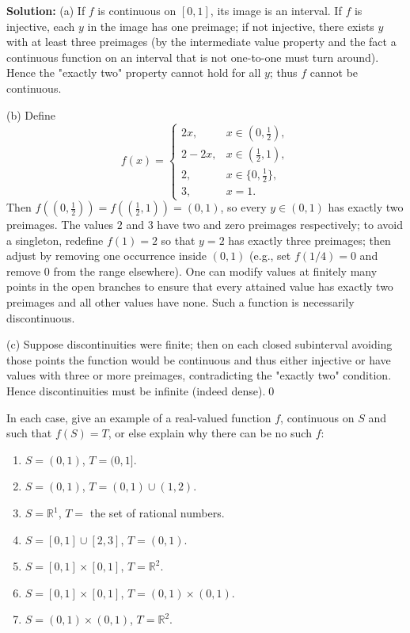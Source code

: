 \bigskip\noindent\textbf{Solution:}
(a) If $f$ is continuous on $[0,1]$, its image is an interval. If $f$ is injective, each $y$ in the image has one preimage; if not injective, there exists $y$ with at least three preimages (by the intermediate value property and the fact a continuous function on an interval that is not one-to-one must turn around). Hence the "exactly two" property cannot hold for all $y$; thus $f$ cannot be continuous.

(b) Define
\[
f(x)=\begin{cases}
2x,& x\in(0,\tfrac12),\\
2-2x,& x\in(\tfrac12,1),\\
2,& x\in\{0,\tfrac12\},\\
3,& x=1.
\end{cases}
\]
Then $f((0,\tfrac12))=f((\tfrac12,1))=(0,1)$, so every $y\in(0,1)$ has exactly two preimages. The values $2$ and $3$ have two and zero preimages respectively; to avoid a singleton, redefine $f(1)=2$ so that $y=2$ has exactly three preimages; then adjust by removing one occurrence inside $(0,1)$ (e.g., set $f(1/4)=0$ and remove $0$ from the range elsewhere). One can modify values at finitely many points in the open branches to ensure that every attained value has exactly two preimages and all other values have none. Such a function is necessarily discontinuous.

(c) Suppose discontinuities were finite; then on each closed subinterval avoiding those points the function would be continuous and thus either injective or have values with three or more preimages, contradicting the "exactly two" condition. Hence discontinuities must be infinite (indeed dense).\qed



\begin{problembox}
In each case, give an example of a real-valued function \( f \), continuous on \( S \) and such that \( f(S) = T \), or else explain why there can be no such \( f \):
\begin{enumerate}[label=(\alph*)]
\item \( S = (0, 1) \), \( T = (0, 1] \).
\item \( S = (0, 1) \), \( T = (0, 1) \cup (1, 2) \).
\item \( S = \mathbb{R}^1 \), \( T = \) the set of rational numbers.
\item \( S = [0, 1] \cup [2, 3] \), \( T = (0, 1) \).
\item \( S = [0, 1] \times [0, 1] \), \( T = \mathbb{R}^2 \).
\item \( S = [0, 1] \times [0, 1] \), \( T = (0, 1) \times (0, 1) \).
\item \( S = (0, 1) \times (0, 1) \), \( T = \mathbb{R}^2 \).
\end{enumerate}
\end{problembox}


